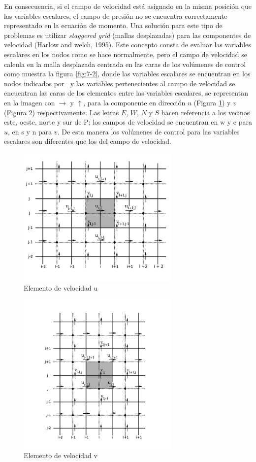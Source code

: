\documentclass[a4paper,10pt, oneside]{book}
\begin{document}
En consecuencia, si el campo de velocidad está asignado en la misma posición que las variables escalares, el campo de presión no se encuentra correctamente representado en la ecuación de momento. Una solución para este tipo de problemas es utilizar \textit{staggered grid} (mallas desplazadas) para las componentes de velocidad (Harlow and welch, 1995). Este concepto consta de evaluar las variables escalares en los nodos como se hace normalmente, pero el campo de velocidad se calcula en la malla desplazada centrada en las caras de los volúmenes de control como muestra la figura \ref{fig:7-2}, donde las variables escalares se encuentran en los nodos indicados por \textbullet $~$ y las variables pertenecientes al campo de velocidad se encuentran las caras de los elementos entre las variables escalares, se representan en la imagen con $\longrightarrow$ y $\uparrow$, para la componente en dirección $u$ (Figura \ref{fig:7-3}) y $v$ (Figura \ref{fig:7-4}) respectivamente. Las letras $E$, $W$, $N$ y $S$ hacen referencia a los vecinos este, oeste, norte y sur de P; los campos de velocidad se encuentran en w y e para $u$, en s y n para $v$.  De esta manera los volúmenes de control para las variables escalares son diferentes que los del campo de velocidad.
\begin{figure}[h!]
  \centering
  \includegraphics[width=8cm]{Img/7-3}
  \caption{Elemento de velocidad u}
  \label{fig:7-3}
\end{figure}

\begin{figure}[h!]
  \centering
  \includegraphics[width=8cm]{Img/7-4}
  \caption{Elemento de velocidad v}
  \label{fig:7-4}
\end{figure}
\end{document}
